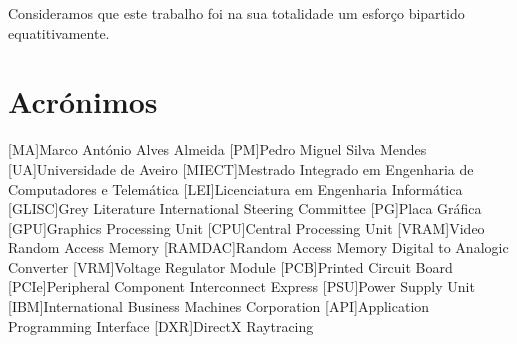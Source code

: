 \documentclass{report}
\begin{document}
\begin{center}
    Consideramos que este trabalho foi na sua totalidade um esforço bipartido equatitivamente.
\end{center}

\chapter*{Acrónimos}
\begin{acronym}
[MA]{Marco António Alves Almeida}
[PM]{Pedro Miguel Silva Mendes}
[UA]{Universidade de Aveiro}
[MIECT]{Mestrado Integrado em Engenharia de Computadores e Telemática}
[LEI]{Licenciatura em Engenharia Informática}
[GLISC]{Grey Literature International Steering Committee}
[PG]{Placa Gráfica}
[GPU]{Graphics Processing Unit}
[CPU]{Central Processing Unit}
[VRAM]{Video Random Access Memory}
[RAMDAC]{Random Access Memory Digital to Analogic Converter}
[VRM]{Voltage Regulator Module}
[PCB]{Printed Circuit Board}
[PCIe]{Peripheral Component Interconnect Express}
[PSU]{Power Supply Unit}
[IBM]{International Business Machines Corporation}
[API]{Application Programming Interface}
[DXR]{DirectX Raytracing}
\end{acronym}


\printbibliography
\end{document}
